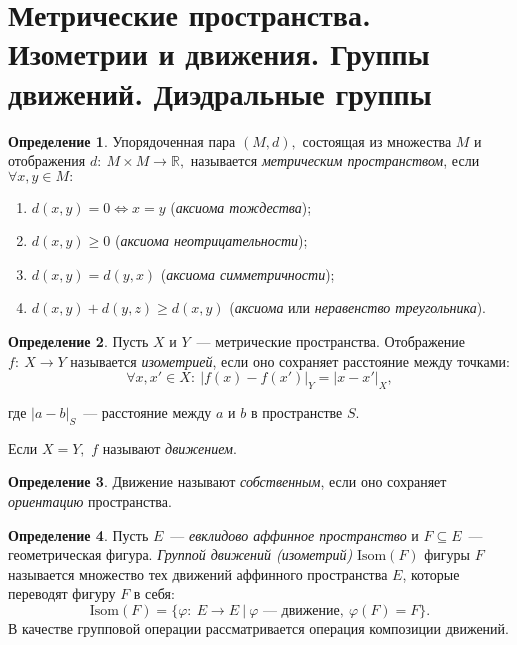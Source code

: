 \documentclass[a4paper, 14pt]{extarticle}
\newcommand{\n}{\par}
\newcommand{\real}{\mathbb{R}}
\newcommand{\Isom}{\mathrm{Isom}}
\renewcommand{\phi}{\varphi}
\theoremstyle{definition}
\newtheorem{definition}{Определение}
\theoremstyle{plain}
\numberwithin{theorem}{section}
\numberwithin{definition}{section}
\numberwithin{statement}{section}
\numberwithin{lemma}{section}
\numberwithin{consequence}{section}
\begin{document}
	\section{Метрические пространства. Изометрии и движения. Группы движений. Диэдральные группы}
		\setcounter{definition}{0}
		\begin{definition}
			Упорядоченная пара ${(M, d),}$ состоящая из множества $M$ и отображения ${d{:} \ M \times M \rightarrow \real,}$  называется \textit{метрическим пространством}, если ${\forall x, y \in M{:}}$
			\begin{enumerate}
				\setlength\itemsep{0.1em}
				\item ${d(x, y) = 0 \Leftrightarrow x = y}$ (\textit{аксиома тождества});
				\item ${d(x, y) \geqslant 0}$ (\textit{аксиома неотрицательности});
				\item ${d(x, y) = d(y, x)}$ (\textit{аксиома симметричности});
				\item ${d(x, y) + d(y, z) \geqslant d(x, y)}$ (\textit{аксиома} или \textit{неравенство треугольника}).
			\end{enumerate}
		\end{definition}
		\begin{definition}
			Пусть $X$ и $Y$~--- метрические пространства. Отображение ${f{:} \ X \rightarrow Y}$ называется \textit{изометрией}, если оно сохраняет расстояние между точками:
			\begin{equation*}
				\forall x, x' \in X{:} \ |f(x) - f(x')|_Y = |x - x'|_X,
			\end{equation*} \n
			где ${|a - b|_S}$~--- расстояние между $a$ и $b$ в пространстве $S$.\n
			Если ${X = Y,}$ $f$ называют \textit{движением}.
		\end{definition}
		\begin{definition}
			Движение называют \textit{собственным}, если оно сохраняет \textit{ориентацию} пространства.
		\end{definition}
		\begin{definition}
			Пусть $E$~--- \textit{евклидово аффинное пространство} и ${F \subseteq E}$~--- геометрическая фигура. \textit{Группой движений (изометрий)} ${\Isom(F)}$ фигуры $F$ называется множество тех движений аффинного пространства $E$, которые  переводят фигуру $F$ в себя:
			\begin{equation*}
				\Isom(F) = \{\phi{:} \ E \rightarrow E \ | \ \phi\textrm{~--- движение}, \ \phi(F) = F\}.
			\end{equation*} 
			В качестве групповой операции рассматривается операция композиции движений.
		\end{definition}
\end{document}
